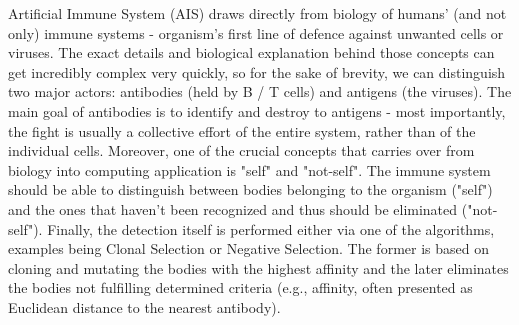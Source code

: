 \documentclass[letterpaper, 10 pt, conference]{ieeeconf}  %
\begin{document}
Artificial Immune System (AIS) draws directly from biology of humans' (and not only) immune systems - organism's first line of defence against unwanted cells or viruses. The exact details and biological explanation behind those concepts can get incredibly complex very quickly, so for the sake of brevity, we can distinguish two major actors: antibodies (held by B / T cells) and antigens (the viruses). The main goal of antibodies is to identify and destroy to antigens - most importantly, the fight is usually a collective effort of the entire system, rather than of the individual cells. Moreover, one of the crucial concepts that carries over from biology into computing application is "self" and "not-self". The immune system should be able to distinguish between bodies belonging to the organism ("self") and the ones that haven't been recognized and thus should be eliminated ("not-self"). Finally, the detection itself is performed either via one of the algorithms, examples being Clonal Selection or Negative Selection. The former is based on cloning and mutating the bodies with the highest affinity and the later eliminates the bodies not fulfilling determined criteria (e.g., affinity, often presented as Euclidean distance to the nearest antibody).
\end{document}
